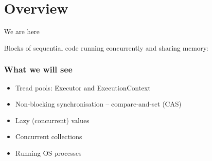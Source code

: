 \documentclass[aspectratio=169]{beamer}
\begin{document}


\section{Overview}

\begin{frame}{We are here}

  \vspace*{-2mm}

  \begin{block}{Blocks of sequential code running concurrently and sharing memory:}
    
  \end{block}
\end{frame}






\begin{frame}[t]\frametitle{What we will see}

  \begin{itemize}
    \item Tread pools: Executor and ExecutionContext
    \item Non-blocking synchronisation -- compare-and-set (CAS)
    \item Lazy (concurrent) values
    \item Concurrent collections
    \item Running OS processes
  \end{itemize}


\end{frame}
\end{document}
